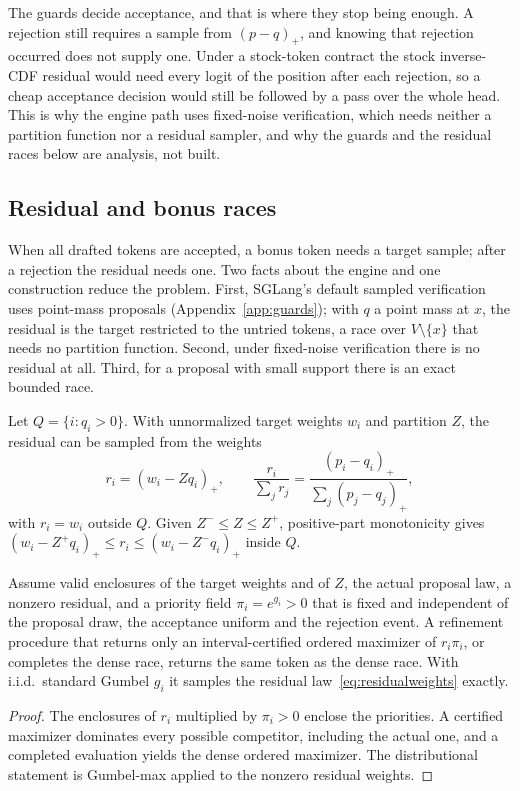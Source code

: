 The guards decide acceptance, and that is where they stop being enough. A rejection still requires a sample from $(p-q)_+$, and knowing that rejection occurred does not supply one. Under a stock-token contract the stock inverse-CDF residual would need every logit of the position after each rejection, so a cheap acceptance decision would still be followed by a pass over the whole head. This is why the engine path uses fixed-noise verification, which needs neither a partition function nor a residual sampler, and why the guards and the residual races below are analysis, not built.

\subsection{Residual and bonus races}\label{app:residual}\label{sec:residual}
When all drafted tokens are accepted, a bonus token needs a target sample; after a rejection the residual needs one. Two facts about the engine and one construction reduce the problem. First, SGLang's default sampled verification uses point-mass proposals (Appendix~\ref{app:guards}); with $q$ a point mass at $x$, the residual is the target restricted to the untried tokens, a race over $V\setminus\{x\}$ that needs no partition function. Second, under fixed-noise verification there is no residual at all. Third, for a proposal with small support there is an exact bounded race.

Let $Q=\{i:q_i>0\}$. With unnormalized target weights $w_i$ and partition $Z$, the residual can be sampled from the weights
\begin{equation}
r_i=(w_i-Zq_i)_+,\qquad\frac{r_i}{\sum_jr_j}=\frac{(p_i-q_i)_+}{\sum_j(p_j-q_j)_+},\label{eq:residualweights}
\end{equation}
with $r_i=w_i$ outside $Q$. Given $Z^-\le Z\le Z^+$, positive-part monotonicity gives $(w_i-Z^+q_i)_+\le r_i\le(w_i-Z^-q_i)_+$ inside $Q$.

\begin{theorem}\label{thm:residualrace}
Assume valid enclosures of the target weights and of $Z$, the actual proposal law, a nonzero residual, and a priority field $\pi_i=e^{g_i}>0$ that is fixed and independent of the proposal draw, the acceptance uniform and the rejection event. A refinement procedure that returns only an interval-certified ordered maximizer of $r_i\pi_i$, or completes the dense race, returns the same token as the dense race. With i.i.d.\ standard Gumbel $g_i$ it samples the residual law~\eqref{eq:residualweights} exactly.
\end{theorem}
\begin{proof}
The enclosures of $r_i$ multiplied by $\pi_i>0$ enclose the priorities. A certified maximizer dominates every possible competitor, including the actual one, and a completed evaluation yields the dense ordered maximizer. The distributional statement is Gumbel-max applied to the nonzero residual weights.
\end{proof}

